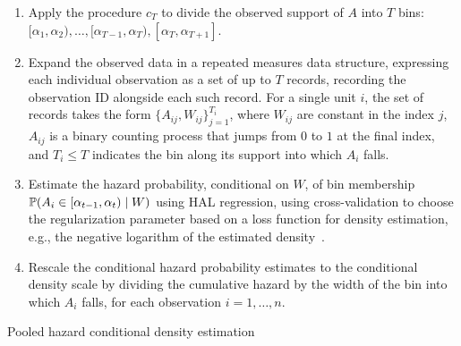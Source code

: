 \begin{algorithm}[H]
\label{alg:pooled_haz_dens}
\SetAlgoLined
{}
\BlankLine
\begin{enumerate}
\itemsep4pt
\item Apply the procedure $c_T$ to divide the observed support of $A$ into $T$
  bins: $[\alpha_1, \alpha_2), \ldots, [\alpha_{T-1}, \alpha_T), [\alpha_T,
  \alpha_{T+1}]$.
\item Expand the observed data in a repeated measures data structure, expressing
  each individual observation as a set of up to $T$ records, recording the
  observation ID alongside each such record. For a single unit $i$, the set of
  records takes the form $\{A_{ij}, W_{ij}\}_{j=1}^{T_i}$, where $W_{ij}$ are
  constant in the index $j$, $A_{ij}$ is a binary counting process that jumps
  from $0$ to $1$ at the final index, and $T_i \leq T$ indicates the bin along
  its support into which $A_i$ falls.
\item Estimate the hazard probability, conditional on $W$, of bin membership
  $\mathbb{P}(A_i \in [\alpha_{t-1}, \alpha_t) \mid W)$ using HAL regression, using
  cross-validation to choose the regularization parameter based on a loss
  function for density estimation, e.g., the negative logarithm of the estimated
  density~\citep{dudoit2005asymptotics}.
\item Rescale the conditional hazard probability estimates to the conditional
  density scale by dividing the cumulative hazard by the width of the bin into
  which $A_i$ falls, for each observation $i = 1, \ldots, n$.
\end{enumerate}
\BlankLine
{}
\caption{Pooled hazard conditional density estimation}
\end{algorithm}

